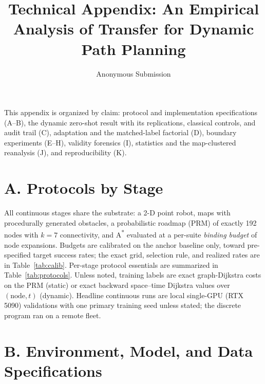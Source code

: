 \documentclass[letterpaper]{article} %
\title{Technical Appendix: An Empirical Analysis of Transfer for Dynamic Path Planning}
\author{Anonymous Submission}
\begin{document}
\maketitle

This appendix is organized by claim: protocol and implementation specifications (A--B), the dynamic zero-shot result with its replications, classical controls, and audit trail (C), adaptation and the matched-label factorial (D), boundary experiments (E--H), validity forensics (I), statistics and the map-clustered reanalysis (J), and reproducibility (K).

\section{A. Protocols by Stage}

All continuous stages share the substrate: a 2-D point robot, maps with procedurally generated obstacles, a probabilistic roadmap (PRM) of exactly 192 nodes with $k{=}7$ connectivity, and A\textsuperscript{*} evaluated at a per-suite \emph{binding budget} of node expansions. Budgets are calibrated on the anchor baseline only, toward pre-specified target success rates; the exact grid, selection rule, and realized rates are in Table~\ref{tab:calib}. Per-stage protocol essentials are summarized in Table~\ref{tab:protocols}. Unless noted, training labels are exact graph-Dijkstra costs on the PRM (static) or exact backward space--time Dijkstra values over $(\text{node},t)$ (dynamic). Headline continuous runs are local single-GPU (RTX 5090) validations with one primary training seed unless stated; the discrete program ran on a remote fleet.

\section{B. Environment, Model, and Data Specifications}
\end{document}
